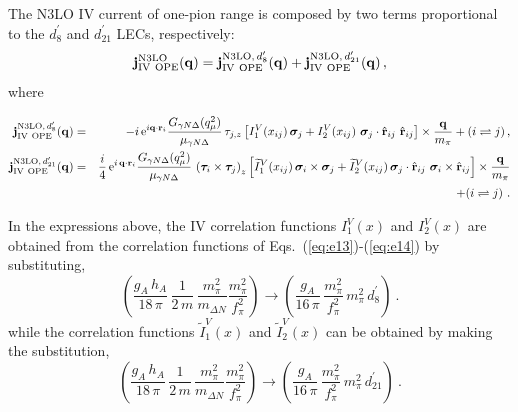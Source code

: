 \documentclass[aps,prc,floatfix,showpacs,twocolumn, preprintnumbers]{revtex4-2}
\begin{document}
The N3LO IV current of one-pion range is composed by two terms proportional to the $d_8^\prime$ and $d_{21}^\prime$ LECs, respectively:
\begin{equation}
{\bf j}^{\rm N3LO}_{\rm IV~OPE}({\bf q}) = {\bf j}^{{\rm N3LO}, \,d_8^\prime}_{\rm IV~OPE}({\bf q}) + {\bf j}^{{\rm N3LO}, \,d_{21}^\prime}_{\rm IV~OPE}({\bf q})\, \label{eq:n3lo.iv},
\end{equation}
where 
\begin{widetext}
\begin{eqnarray}
 {\bf j}^{{\rm N3LO}, \,d_8^\prime}_{\rm IV~OPE}({\bf q})&=&-i\,{\rm e}^{i {\bf q}\cdot {\bf r}_i}\frac{G_{\gamma N \Delta}(q_{\mu}^2)}{\mu_{\gamma N \Delta}} \, \tau_{j,z}
\left[ I^V_1(x_{ij}) \, {\bm \sigma}_j
+I_{2}^V(x_{ij}) \,\,
 {\bm \sigma}_j\cdot \hat{\bf r}_{ij} \,\, \hat{\bf r}_{ij}\right]\times 
 \frac{{\bf q}}{m_\pi} +(i\rightleftharpoons j )\, , \label{eq:n3lo.iv.d8}\\
 {\bf j}^{{\rm N3LO}, \,d_{21}^\prime}_{\rm IV~OPE}({\bf q})&=& \frac{i}{4}\, {\rm e}^{i\, {\bf q}\cdot {\bf r}_i}\frac{G_{\gamma N \Delta}(q_{\mu}^2)}{\mu_{\gamma N \Delta}} \, \left({\bm \tau}_i\times{\bm \tau}_j\right)_z \left[
\widetilde{I}^{V}_1 (x_{ij})\, {\bm \sigma}_i \times {\bm \sigma}_j
+\widetilde{I}^V_2(x_{ij})\, {\bm \sigma}_j\cdot \hat{\bf r}_{ij}\,\, {\bm \sigma}_i\times \hat{\bf r}_{ij}\right] \times\frac{{\bf q}}{m_\pi} \nonumber \\
&&\hspace{8cm}+(i\rightleftharpoons j )\ . \label{eq:n3lo.iv.d21} 
\end{eqnarray}
\end{widetext}
In the expressions above, the IV correlation functions $I^V_1(x)$ and $I^V_2(x)$ are obtained from the correlation functions of Eqs.~(\ref{eq:e13})-(\ref{eq:e14}) by substituting,
\begin{equation}\label{eq:d8}
\left(\frac{g_A\,h_A}{18\, \pi}\,
\frac{1}{2\, m}\, \frac{m_\pi^2}{m_{\Delta N}}
 \frac{m_\pi^2}{f_\pi^2}\right) 
 \longrightarrow \left(\frac{g_A}{16\, \pi}\,
 \frac{m_\pi^2}{f_\pi^2}\, m_\pi^2\, d_8^\prime \right) \ .
\end{equation}
while the correlation functions $\widetilde{I}^V_1(x)$ and $\widetilde{I}^V_2(x)$ can be obtained by making the substitution, 
\begin{equation}\label{eq:d21}
\left(\frac{g_A\,h_A}{18\, \pi}\,
\frac{1}{2\, m}\, \frac{m_\pi^2}{m_{\Delta N}}
 \frac{m_\pi^2}{f_\pi^2}\right) 
 \longrightarrow \left(\frac{g_A}{16\, \pi}\,
 \frac{m_\pi^2}{f_\pi^2}\, m_\pi^2\, d_{21}^\prime \right) \ .
\end{equation}
\end{document}
